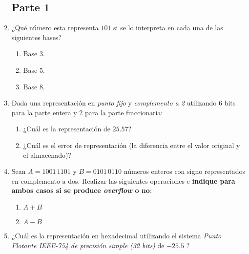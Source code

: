 \documentclass[12pt]{article}
\begin{document}
\begin{enumerate}
\subsection*{Parte 1}

    \item ¿Qué número esta representa $101$ si se lo interpreta en cada una de
        las siguientes bases?

        \begin{enumerate}

            \item Base 3.

            \item Base 5.

            \item Base 8.

        \end{enumerate}

    \item Dada una representación en \emph{punto fijo} y \emph{complemento
        a 2} utilizando 6 bits para la parte entera y 2 para la parte
        fraccionaria:

        \begin{enumerate}

            \item ¿Cuál es la representación de $25.57$?

            \item ¿Cuál es el error de representación (la diferencia entre el
                valor original y el almacenado)?

        \end{enumerate}

    \item Sean $A=1001\,1101$ y $B=0101\,0110$ números enteros con signo
        representados en complemento a dos. Realizar las siguientes
        operaciones e \textbf{indique para ambos casos si se produce
        \emph{overflow} o no}:

        \begin{enumerate}

            \item $A+B$

            \item $A-B$

        \end{enumerate}

    \item ¿Cuál es la representación en hexadecimal utilizando el sistema
        \emph{Punto Flotante IEEE-754 de precisión simple (32 bits)} de
        $-25.5$ ?


\end{enumerate}
\end{document}
